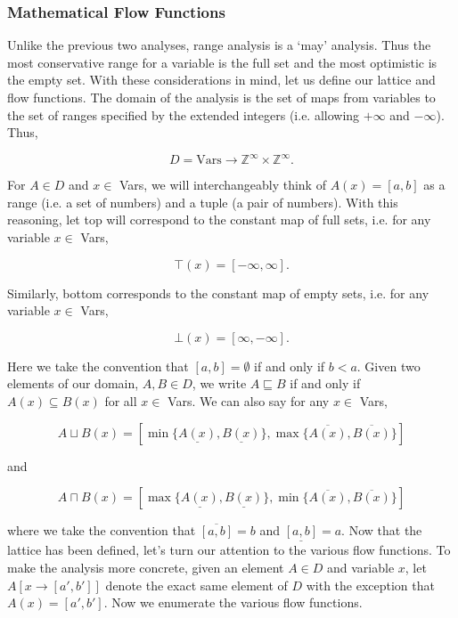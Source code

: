 \documentclass{article}
\newcommand{\Z}{\mathbb{Z}}
\theoremstyle{definition}
\begin{document}
\subsubsection{Mathematical Flow Functions}

Unlike the previous two analyses, range analysis is a `may' analysis. Thus the most conservative range for a variable is the full set and the most optimistic is the empty set. With these considerations in mind, let us define our lattice and flow functions. The domain of the analysis is the set of maps from variables to the set of ranges specified by the extended integers (i.e. allowing $+\infty$ and $-\infty$). Thus,

\[ D = \text{Vars} \rightarrow \Z^{\infty} \times \Z^{\infty}. \]

For $A \in D$ and $x \in $ Vars, we will interchangeably think of $A(x) = [a, b]$ as a range (i.e. a set of numbers) and a tuple (a pair of numbers). With this reasoning, let top will correspond to the constant map of full sets, i.e. for any variable $x \in $ Vars,

\[  \top(x) =  [-\infty, \infty]. \]

Similarly, bottom corresponds to the constant map of empty sets, i.e. for any variable $x \in $ Vars,

\[  \bot(x) =  [\infty, -\infty]. \]

Here we take the convention that $[a, b] = \emptyset$ if and only if $b < a$. Given two elements of our domain, $A, B \in D$, we write $A \sqsubseteq B$ if and only if $A(x) \subseteq B(x)$ for all $x \in$ Vars. We can also say for any $x \in $ Vars,

\[ A \sqcup B(x) = [\min \{ \underline{A(x)}, \underline{B(x)} \} , \max \{  \overline{A(x)}, \overline{B(x)} \} ]\]

\noindent and

\[ A \sqcap B(x) = [\max \{  \underline{A(x)} , \underline{B(x)} \} , \min \{ \overline{A(x)} , \overline{B(x)} \} ]\]

\noindent where we take the convention that $\overline{[a, b]} = b$ and $\underline{[a, b]} = a$. Now that the lattice has been defined, let's turn our attention to the various flow functions. To make the analysis more concrete, given an element $A \in D$ and variable $x$, let $A[x \rightarrow [a', b']]$ denote the exact same element of $D$ with the exception that $A(x) = [a', b']$. Now we enumerate the various flow functions.
\end{document}

